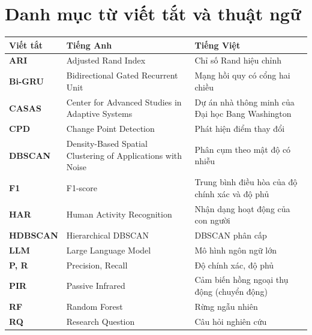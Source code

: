 \chapter*{Danh mục từ viết tắt và thuật ngữ}

{\renewcommand{\arraystretch}{1.25}
\noindent\begin{tabularx}{\textwidth}{@{}>{\bfseries}p{2.2cm}>{\raggedright\arraybackslash}X>{\raggedright\arraybackslash}X@{}}
\toprule
Viết tắt & \textbf{Tiếng Anh} & \textbf{Tiếng Việt}\\
\midrule
ARI & Adjusted Rand Index & Chỉ số Rand hiệu chỉnh\\
Bi-GRU & Bidirectional Gated Recurrent Unit & Mạng hồi quy có cổng hai chiều\\
CASAS & Center for Advanced Studies in Adaptive Systems & Dự án nhà thông minh của Đại học Bang Washington\\
CPD & Change Point Detection & Phát hiện điểm thay đổi\\
DBSCAN & Density-Based Spatial Clustering of Applications with Noise & Phân cụm theo mật độ có nhiễu\\
F1 & F1-score & Trung bình điều hòa của độ chính xác và độ phủ\\
HAR & Human Activity Recognition & Nhận dạng hoạt động của con người\\
HDBSCAN & Hierarchical DBSCAN & DBSCAN phân cấp\\
LLM & Large Language Model & Mô hình ngôn ngữ lớn\\
P, R & Precision, Recall & Độ chính xác, độ phủ\\
PIR & Passive Infrared & Cảm biến hồng ngoại thụ động (chuyển động)\\
RF & Random Forest & Rừng ngẫu nhiên\\
RQ & Research Question & Câu hỏi nghiên cứu\\
\bottomrule
\end{tabularx}\par}

